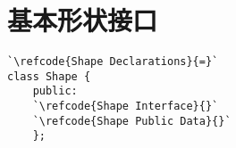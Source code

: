 \section{基本形状接口}\label{sec:基本形状接口}

\label{code:overview_Shape}
\begin{lstlisting}
`\refcode{Shape Declarations}{=}`
class Shape {
    public:
    `\refcode{Shape Interface}{}`
    `\refcode{Shape Public Data}{}`
    };
\end{lstlisting}